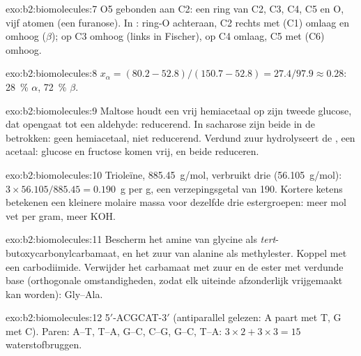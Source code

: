 \begin{solution}{exo:b2:biomolecules:7}
O5 gebonden aan C2: een ring van C2, C3, C4, C5 en O, vijf atomen (een furanose). In : ring-O
achteraan, C2 rechts met  (C1) omlaag en  omhoog ($\beta$); op C3  omhoog (links in
Fischer), op C4  omlaag, C5 met  (C6) omhoog.
\end{solution}

\begin{solution}{exo:b2:biomolecules:8}
$x_\alpha = (80.2 - 52.8)/(150.7 - 52.8) = 27.4/97.9 \approx 0.28$: 28~\% $\alpha$, 72~\% $\beta$.
\end{solution}

\begin{solution}{exo:b2:biomolecules:9}
Maltose houdt een vrij hemiacetaal op zijn tweede glucose, dat opengaat tot een aldehyde: reducerend. In sacharose
zijn beide  in de  betrokken: geen hemiacetaal, niet reducerend. Verdund zuur
hydrolyseert de , een acetaal: glucose en fructose komen vrij, en beide reduceren.
\end{solution}

\begin{solution}{exo:b2:biomolecules:10}
Trioleïne, \qty{885.45}{g/mol}, verbruikt drie  (\qty{56.105}{g/mol}): $3 \times 56.105/885.45 =
0.190$~g per g, een verzepingsgetal van 190. Kortere ketens betekenen een kleinere molaire massa voor dezelfde
drie estergroepen: meer mol vet per gram, meer KOH.
\end{solution}

\begin{solution}{exo:b2:biomolecules:11}
Bescherm het amine van glycine als \textit{tert}-butoxycarbonylcarbamaat, en het zuur van alanine als
methylester. Koppel met een carbodiimide. Verwijder het carbamaat met zuur en de ester met verdunde base
(orthogonale omstandigheden, zodat elk uiteinde afzonderlijk vrijgemaakt kan worden): Gly--Ala.
\end{solution}

\begin{solution}{exo:b2:biomolecules:12}
5$'$-ACGCAT-3$'$ (antiparallel gelezen: A paart met T, G met C). Paren: A--T, T--A, G--C, C--G, G--C, T--A:
$3 \times 2 + 3 \times 3 = 15$ waterstofbruggen.
\end{solution}

